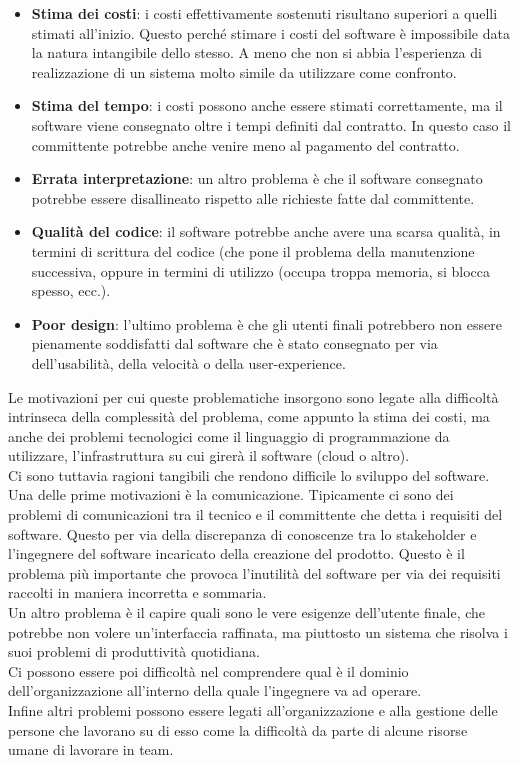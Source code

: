 \begin{itemize}[noitemsep]
    \item \textbf{Stima dei costi}: i costi effettivamente sostenuti risultano superiori a quelli stimati all'inizio. Questo perché stimare i costi del software è impossibile data la natura intangibile dello stesso. A meno che non si abbia l'esperienza di realizzazione di un sistema molto simile da utilizzare come confronto.
    \item \textbf{Stima del tempo}: i costi possono anche essere stimati correttamente, ma il software viene consegnato oltre i tempi definiti dal contratto. In questo caso il committente potrebbe anche venire meno al pagamento del contratto.
    \item \textbf{Errata interpretazione}: un altro problema è che il software consegnato potrebbe essere disallineato rispetto alle richieste fatte dal committente.
    \item \textbf{Qualità del codice}: il software potrebbe anche avere una scarsa qualità, in termini di scrittura del codice (che pone il problema della manutenzione successiva, oppure in termini di utilizzo (occupa troppa memoria, si blocca spesso, ecc.).
    \item \textbf{Poor design}: l'ultimo problema è che gli utenti finali potrebbero non essere pienamente soddisfatti dal software che è stato consegnato per via dell'usabilità, della velocità o della user-experience.
\end{itemize}
Le motivazioni per cui queste problematiche insorgono sono legate alla difficoltà intrinseca della complessità del problema, come appunto la stima dei costi, ma anche dei problemi tecnologici come il linguaggio di programmazione da utilizzare, l'infrastruttura su cui girerà il software (cloud o altro).\\
Ci sono tuttavia ragioni tangibili che rendono difficile lo sviluppo del software.
Una delle prime motivazioni è la comunicazione.
Tipicamente ci sono dei problemi di comunicazioni tra il tecnico e il committente che detta i requisiti del software.
Questo per via della discrepanza di conoscenze tra lo stakeholder e l'ingegnere del software incaricato della creazione del prodotto.
Questo è il problema più importante che provoca l'inutilità del software per via dei requisiti raccolti in maniera incorretta e sommaria.\\
Un altro problema è il capire quali sono le vere esigenze dell'utente finale, che potrebbe non volere un'interfaccia raffinata, ma piuttosto un sistema che risolva i suoi problemi di produttività quotidiana.\\
Ci possono essere poi difficoltà nel comprendere qual è il dominio dell'organizzazione all'interno della quale l'ingegnere va ad operare.\\
Infine altri problemi possono essere legati all'organizzazione e alla gestione delle persone che lavorano su di esso come la difficoltà da parte di alcune risorse umane di lavorare in team.

